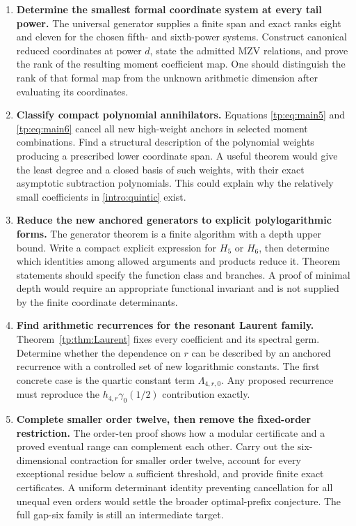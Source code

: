 \begin{enumerate}[label=\textbf{R\arabic*.}]
\item \textbf{Determine the smallest formal coordinate system at every
tail power.}
The universal generator supplies a finite span and exact ranks eight
and eleven for the chosen fifth- and sixth-power systems. Construct
canonical reduced coordinates at power $d$, state the admitted MZV
relations, and prove the rank of the resulting moment coefficient map.
One should distinguish the rank of that formal map from the unknown
arithmetic dimension after evaluating its coordinates.

\item \textbf{Classify compact polynomial annihilators.}
Equations \eqref{tp:eq:main5} and \eqref{tp:eq:main6} cancel all new
high-weight anchors in selected moment combinations. Find a structural
description of the polynomial weights producing a prescribed lower
coordinate span. A useful theorem would give the least degree and a
closed basis of such weights, with their exact asymptotic subtraction
polynomials. This could explain why the relatively small coefficients
in \eqref{intro:quintic} exist.

\item \textbf{Reduce the new anchored generators to explicit
polylogarithmic forms.}
The generator theorem is a finite algorithm with a depth upper bound.
Write a compact explicit expression for $H_5$ or $H_6$, then determine
which identities among allowed arguments and products reduce it.
Theorem statements should specify the function class and branches.
A proof of minimal depth would require an appropriate functional
invariant and is not supplied by the finite coordinate determinants.

\item \textbf{Find arithmetic recurrences for the resonant Laurent
family.}
Theorem~\ref{tp:thm:Laurent} fixes every coefficient and its spectral
germ. Determine whether the dependence on $r$ can be described by an
anchored recurrence with a controlled set of new logarithmic constants.
The first concrete case is the quartic constant term
$\Lambda_{4,r,0}$. Any proposed recurrence must reproduce the
$h_{4,r}\gamma_0(1/2)$ contribution exactly.

\item \textbf{Complete smaller order twelve, then remove the fixed-order
restriction.}
The order-ten proof shows how a modular certificate and a proved
eventual range can complement each other. Carry out the six-dimensional
contraction for smaller order twelve, account for every exceptional
residue below a sufficient threshold, and provide finite exact
certificates. A uniform determinant identity preventing cancellation
for all unequal even orders would settle the broader optimal-prefix
conjecture. The full gap-six family is still an intermediate target.


\end{enumerate}
